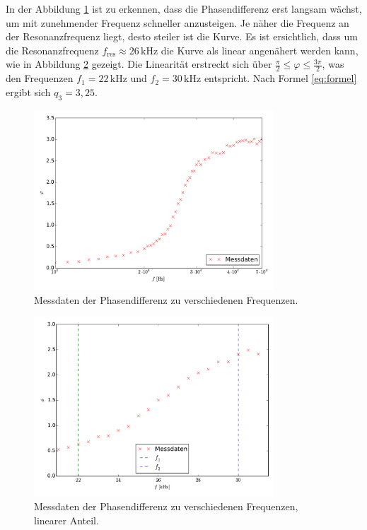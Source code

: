In der Abbildung \ref{fig:phase} ist zu erkennen, dass die Phasendifferenz erst langsam wächst, um mit zunehmender Frequenz schneller anzusteigen. 
Je näher die Frequenz an der Resonanzfrequenz liegt, desto steiler ist die Kurve. 
Es ist ersichtlich, dass um die Resonanzfrequenz  $f_\mathup{res}\approx26\,\si{\kilo\hertz}$ die Kurve als linear angenähert werden kann, wie in Abbildung \ref{fig:phase_lin} gezeigt. 
Die Linearität erstreckt sich über $\frac{\pi}{2}\leq\varphi\leq\frac{3\pi}{2}$, was den Frequenzen $f_1=22\,\si{\kilo\hertz}$ und $f_2=30\,\si{\kilo\hertz}$ entspricht. 
Nach Formel \eqref{eq:formel} ergibt sich $q_3=3,25$.
\begin{figure}[h]
		\centering
		\includegraphics[width=0.8\textwidth]{build/plot_phase.pdf}
		\caption{Messdaten der Phasendifferenz zu verschiedenen Frequenzen. \cite{matplotlib}}
\label{fig:phase}
\end{figure}
\begin{figure}[h]
		\centering
		\includegraphics[width=0.8\textwidth]{build/plot_phase_linear.pdf}
		\caption{Messdaten der Phasendifferenz zu verschiedenen Frequenzen, linearer Anteil. \cite{matplotlib}}
\label{fig:phase_lin}
\end{figure}
